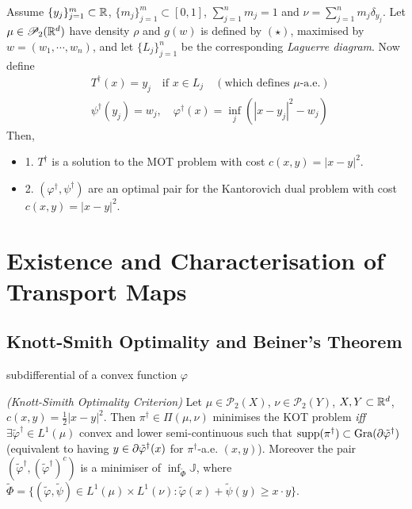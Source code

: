 \documentclass[10pt,a4paper]{article}
\renewenvironment{i}
{\begin{itemize} 
	}%
	{\end{itemize}
}
\begin{document}
 Assume $\{y_j \}_{j=1}^m \subset \mathbb{R}$, $\{m_j\}_{j=1}^m \subset [0,1]$, $\sum_{j=1}^n m_j =1$ and $\nu = \sum_{j=1}^n m_j \delta_{y_j}$. Let $\mu \in \mathscr{P}_2(\mathbb{R}^d)$ have density $\rho$ and $g(w)$ is defined by $(\star)$, maximised by $w= (w_1, \cdots, w_n)$, and let $\{L_j\}_{j=1}^n$ be the corresponding \emph{Laguerre diagram}. Now define
\begin{align*}
&T^{\dagger}(x) = y_j \quad \text{if } x\in L_j \quad (\text{which defines }\mu\text{-a.e.}) \\
&\psi^{\dagger}(y_j) = w_j, \quad \varphi^{\dagger}(x) = \inf_{j} (|x-y_j|^2 -w_j)
\end{align*}
Then,
\begin{i}
\item[1.] $T^{\dagger}$ is a solution to the MOT problem with cost $c(x,y) = |x-y|^2$.
\item[2.] $(\varphi^{\dagger}, \psi^{\dagger})$ are an optimal pair for the Kantorovich dual problem with cost $c(x,y) = |x-y|^2$.
\end{i}
\s

\section{Existence and Characterisation of Transport Maps}



\subsection{Knott-Smith Optimality and Beiner's Theorem}

 subdifferential of a convex function $\varphi$
\s

 \emph{(Knott-Simith Optimality Criterion)} Let $\mu \in \mathscr{P}_2(X)$, $\nu \in \mathscr{P}_2(Y)$, $X, Y \subset \mathbb{R}^d$, $c(x,y)= \frac{1}{2}|x-y|^2$. Then $\pi^{\dagger} \in \Pi(\mu, \nu)$ minimises the KOT problem \emph{iff} $\exists \tilde{\varphi}^{\dagger} \in L^1(\mu)$ convex and lower semi-continuous such that $\text{supp}(\pi^{\dagger}) \subset \text{Gra}( \partial \tilde{\varphi}^{\dagger})$ (equivalent to having $y\in \partial \tilde{\varphi}^{\dagger}(x)$ for $\pi^{\dagger}$-a.e. $(x,y)$). Moreover the pair $(\tilde{\varphi}^{\dagger}, (\tilde{\varphi}^{\dagger})^c)$ is a minimiser of $\inf_{\tilde{\Phi}} \mathbb{J}$, where $\tilde{\Phi} = \{ (\tilde{\varphi}, \tilde{\psi}) \in L^1(\mu)\times L^1(\nu) : \tilde{\varphi}(x) + \tilde{\psi}(y) \geq x\cdot y \}$.
\s
\end{document}
